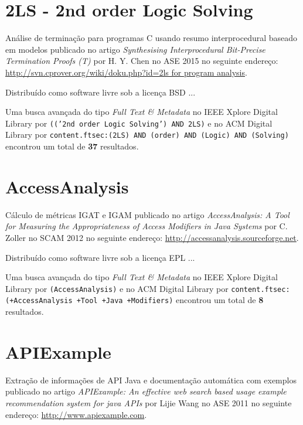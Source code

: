

\label{softwares-summary}

\section{2LS - 2nd order Logic Solving}

Análise de terminação para programas C usando resumo interprocedural baseado em modelos
publicado no artigo
{\it Synthesising Interprocedural Bit-Precise Termination Proofs (T)}
por
H. Y. Chen
no
ASE
2015
no seguinte endereço:
\url{http://svn.cprover.org/wiki/doku.php?id=2ls for program analysis}.

Distribuído como software livre
sob a licença BSD ...


Uma busca avançada do tipo {\it Full Text \& Metadata} no IEEE Xplore Digital Library por
\texttt{(('2nd order Logic Solving') AND 2LS)}
e no ACM Digital Library por
\texttt{content.ftsec:(2LS) AND (order) AND (Logic) AND (Solving)}
encontrou um total de
{\bf 37}
resultados.

\section{AccessAnalysis}

Cálculo de métricas IGAT e IGAM
publicado no artigo
{\it AccessAnalysis: A Tool for Measuring the Appropriateness of Access Modifiers in Java Systems}
por
C. Zoller
no
SCAM
2012
no seguinte endereço:
\url{http://accessanalysis.sourceforge.net}.

Distribuído como software livre
sob a licença EPL ...


Uma busca avançada do tipo {\it Full Text \& Metadata} no IEEE Xplore Digital Library por
\texttt{(AccessAnalysis)}
e no ACM Digital Library por
\texttt{content.ftsec:(+AccessAnalysis +Tool +Java +Modifiers)}
encontrou um total de
{\bf 8}
resultados.

\section{APIExample}

Extração de informações de API Java e documentação automática com exemplos
publicado no artigo
{\it APIExample: An effective web search based usage example recommendation system for java APIs}
por
Lijie Wang
no
ASE
2011
no seguinte endereço:
\url{http://www.apiexample.com}.

